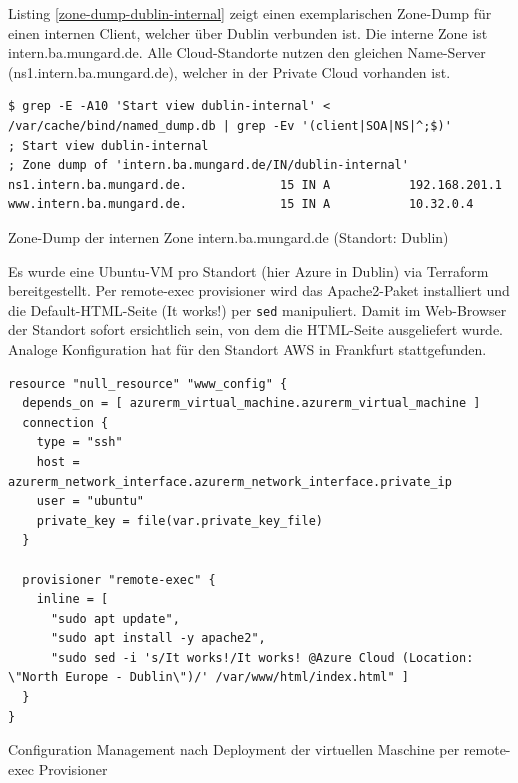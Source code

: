 Listing \ref{zone-dump-dublin-internal} zeigt einen exemplarischen Zone-Dump für einen internen \gls{Client}, welcher über Dublin verbunden ist. Die interne Zone ist intern.ba.mungard.de. Alle Cloud-Standorte nutzen den gleichen Name-Server (ns1.intern.ba.mungard.de), welcher in der Private Cloud vorhanden ist.\\
\begin{listing}[h]
\begin{verbatim}
$ grep -E -A10 'Start view dublin-internal' < /var/cache/bind/named_dump.db | grep -Ev '(client|SOA|NS|^;$)'
; Start view dublin-internal
; Zone dump of 'intern.ba.mungard.de/IN/dublin-internal'
ns1.intern.ba.mungard.de.             15 IN A           192.168.201.1
www.intern.ba.mungard.de.             15 IN A           10.32.0.4
\end{verbatim}
\caption{Zone-Dump der internen Zone intern.ba.mungard.de (Standort: Dublin)}
\label{zone-dump-dublin-internal}
\end{listing}\FloatBarrier
Es wurde eine Ubuntu-\gls{VM} pro Standort (hier Azure in Dublin) via Terraform bereitgestellt. Per remote-exec provisioner wird das Apache2-Paket installiert und die Default-HTML-Seite (\glqq It works!\grqq{}) per \texttt{sed} manipuliert. Damit im Web-Browser der Standort sofort ersichtlich sein, von dem die HTML-Seite ausgeliefert wurde. Analoge Konfiguration hat für den Standort AWS in Frankfurt stattgefunden.
\begin{listing}[h]
\begin{verbatim}
resource "null_resource" "www_config" {
  depends_on = [ azurerm_virtual_machine.azurerm_virtual_machine ]
  connection {
    type = "ssh"
    host = azurerm_network_interface.azurerm_network_interface.private_ip
    user = "ubuntu"
    private_key = file(var.private_key_file)
  }

  provisioner "remote-exec" {
    inline = [
      "sudo apt update",
      "sudo apt install -y apache2",
      "sudo sed -i 's/It works!/It works! @Azure Cloud (Location: \"North Europe - Dublin\")/' /var/www/html/index.html" ]
  }
}
\end{verbatim}
\caption{Configuration Management nach Deployment der virtuellen Maschine per remote-exec Provisioner}
\label{sed-replace-apache-location}
\end{listing}\FloatBarrier

